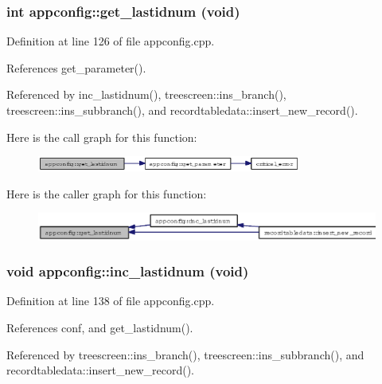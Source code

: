 \subsubsection{\setlength{\rightskip}{0pt plus 5cm}int appconfig::get\_\-lastidnum (void)}\label{classappconfig_098e273bf84b2ce0ffcf69ce98d99acb}




Definition at line 126 of file appconfig.cpp.

References get\_\-parameter().

Referenced by inc\_\-lastidnum(), treescreen::ins\_\-branch(), treescreen::ins\_\-subbranch(), and recordtabledata::insert\_\-new\_\-record().

Here is the call graph for this function:\begin{figure}[H]
\begin{center}
\leavevmode
\includegraphics[width=246pt]{classappconfig_098e273bf84b2ce0ffcf69ce98d99acb_cgraph}
\end{center}
\end{figure}


Here is the caller graph for this function:\begin{figure}[H]
\begin{center}
\leavevmode
\includegraphics[width=399pt]{classappconfig_098e273bf84b2ce0ffcf69ce98d99acb_icgraph}
\end{center}
\end{figure}
\subsubsection{\setlength{\rightskip}{0pt plus 5cm}void appconfig::inc\_\-lastidnum (void)}\label{classappconfig_fe3089f67aa81ee6d5e8bd50dfe62e6b}




Definition at line 138 of file appconfig.cpp.

References conf, and get\_\-lastidnum().

Referenced by treescreen::ins\_\-branch(), treescreen::ins\_\-subbranch(), and recordtabledata::insert\_\-new\_\-record().

